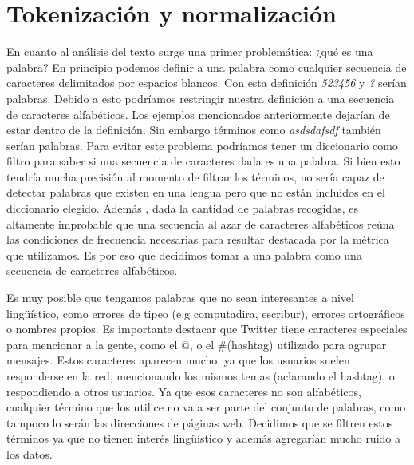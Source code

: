 

\section{Tokenización y normalización}

En cuanto al análisis del texto surge una primer problemática: ¿qué es una palabra? En principio podemos definir a una palabra como cualquier secuencia de caracteres delimitados por espacios blancos. Con esta definición \textit{523456} y \textit{?} serían palabras. Debido a esto podríamos restringir nuestra definición a una secuencia de caracteres alfabéticos. Los ejemplos mencionados anteriormente dejarían de estar dentro de la definición. Sin embargo términos como \textit{asdsdafsdf} también serían palabras. Para evitar este problema podríamos tener un diccionario como filtro para saber si una secuencia de caracteres dada es una palabra. Si bien esto tendría mucha precisión al momento de filtrar los términos, no sería capaz de detectar palabras que existen en una lengua pero que no están incluidos en el diccionario elegido. Además , dada la cantidad de palabras recogidas, es altamente improbable que una secuencia al azar de caracteres alfabéticos reúna las condiciones de frecuencia necesarias para resultar destacada por la métrica que utilizamos. Es por eso que decidimos tomar a una palabra como una secuencia de caracteres alfabéticos.

Es muy posible que tengamos palabras que no sean interesantes a nivel lingüístico, como errores de tipeo (e.g computadira, escribur), errores ortográficos o  nombres propios. Es importante destacar que Twitter tiene caracteres especiales para mencionar a la gente, como el @, o el \#(hashtag) utilizado para agrupar mensajes. Estos caracteres aparecen mucho, ya que los usuarios suelen responderse en la red, mencionando los mismos temas (aclarando el hashtag), o respondiendo a otros usuarios. Ya que esos caracteres no son alfabéticos, cualquier término que los utilice no va a ser parte del conjunto de palabras, como tampoco lo serán las direcciones de páginas web. Decidimos que se filtren estos términos ya que no tienen interés lingüístico y además agregarían mucho ruido a los datos.

